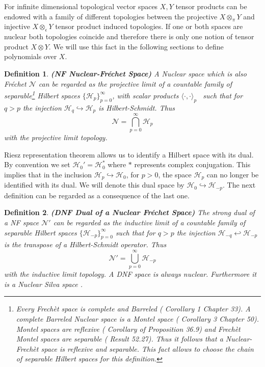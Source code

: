 \documentclass{elsarticle}%
\newtheorem{definition}{Definition}%
\begin{document}
For infinite dimensional topological vector spaces $X,Y$ tensor products  can be endowed with a family of  different topologies between the projective $X\otimes_\pi Y$ and injective $X\otimes_\epsilon Y$ tensor product induced topologies.  If one or both spaces are nuclear both topologies coincide and therefore there is only one notion of tensor product $X\otimes Y$. We will  use this fact in the following sections to define polynomials over $X$.


\begin{definition}
    \label{def:FN}
    {\bf (NF  Nuclear-Fréchet Space)} A Nuclear space which is also Fréchet  $\mathcal{N}$  can be regarded as the projective limit of a countable family of separable\footnote{Every Frechèt space is complete and  Barreled   (\cite{trevesTopologicalVector1967} Corollary 1 Chapter 33). A complete  Barreled Nuclear space is a Montel space   (\cite{trevesTopologicalVector1967} Corollary 3 Chapter 50). Montel spaces are reflexive (\cite{trevesTopologicalVector1967} Corollary of Proposition 36.9) and Frechèt Montel spaces are separable  (\cite{krieglConvenientSetting1997} Result 52.27). Thus it follows that a Nuclear-Frechèt space is reflexive and separable. This fact allows to choose the chain of separable  Hilbert spaces for this definition. } Hilbert spaces $\{\mathcal{H}_p\}_{p=0}^\infty$, with scalar products $\langle \cdot, \cdot  \rangle_p$ \ such that for $q>p$     
    the injection $\mathcal{H}_q\hookrightarrow \mathcal{H}_p$ is Hilbert-Schmidt. Thus
    $$
    \mathcal{N}=\bigcap_{p=0}^\infty\mathcal{H}_p 
    $$
    with the projective limit topology. 
\end{definition}

 Riesz representation theorem allows us to identify a Hilbert space with its dual. By convention we set $\mathcal{H}_0'=\mathcal{H}_0^*$ where $*$ represents complex conjugation. This implies that in the inclusion $\mathcal{H}_p\hookrightarrow\mathcal{H}_0$, for $p>0$, the space $\mathcal{H}_p$ can no longer be identified with its dual. We will denote this dual space by $\mathcal{H}_0\hookrightarrow\mathcal{H}_{-p}$. The next definition can be regarded as a consequence of the last one. 

\begin{definition}
    \label{def:DFN}
    {\bf (DNF Dual of a  Nuclear Fréchet Space)} The strong dual of a NF space  $\mathcal{N}'$  can be regarded as the inductive limit of a countable family of separable Hilbert spaces $\{\mathcal{H}_{-p}\}_{p=0}^\infty$ such that for $q>p$
    the injection $\mathcal{H}_{-q}\hookleftarrow \mathcal{H}_{-p}$ is the transpose of a  Hilbert-Schmidt operator. Thus
    $$
    \mathcal{N}'=\bigcup_{p=0}^\infty\mathcal{H}_{-p} 
    $$
    with the inductive limit topology. A DNF space is always nuclear. Furthermore it is a Nuclear Silva space \cite{krieglConvenientSetting1997}.
\end{definition}
\end{document}
